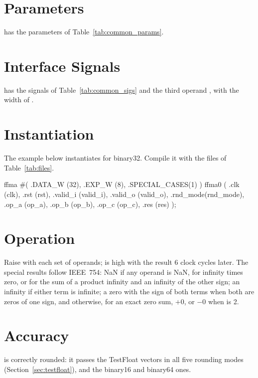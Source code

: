 \section{Parameters}

 has the parameters of Table~\ref{tab:common_params}.

\section{Interface Signals}

 has the signals of Table~\ref{tab:common_sigs} and the third operand
, with the width of .

\section{Instantiation}

The example below instantiates  for binary32.
Compile it with the files of Table~\ref{tab:files}.

\begin{vcode}
ffma #(
   .DATA_W       (32),
   .EXP_W        (8),
   .SPECIAL_CASES(1)
) ffma0 (
   .clk     (clk),
   .rst     (rst),
   .valid_i (valid_i),
   .valid_o (valid_o),
   .rnd_mode(rnd_mode),
   .op_a    (op_a),
   .op_b    (op_b),
   .op_c    (op_c),
   .res     (res)
);
\end{vcode}

\section{Operation}

Raise  with each set of operands;  is high with the
result 6 clock cycles later. The special results follow IEEE~754: NaN if any operand
is NaN, for infinity times zero, or for the sum of a product infinity and an
infinity of the other sign; an infinity if either term is infinite; a zero with the
sign of both terms when both are zeros of one sign, and otherwise, for an exact
zero sum, $+0$, or $-0$ when  is 2.

\section{Accuracy}

 is correctly rounded: it passes the TestFloat  vectors
in all five rounding modes (Section~\ref{sec:testfloat}), and the binary16 and
binary64 ones.
